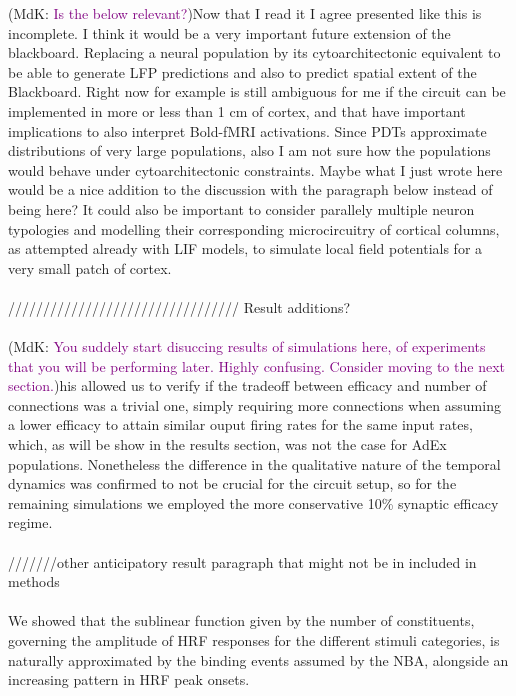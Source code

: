 \documentclass[10pt]{article}
\newcommand{\noteMdK}[2]{(MdK: \textcolor{purple}{#1})}
\newcommand{\notenewMP}[3]{(MP: \textcolor{blue}{#1})}
\begin{document}
\noteMdK{Is the below relevant?} 
\notenewMP{Now that I read it I agree presented like this is incomplete. I think it would be a very important future extension of the blackboard. Replacing a neural population by its cytoarchitectonic equivalent to be able to generate LFP predictions and also to predict spatial extent of the Blackboard. Right now for example is still ambiguous for me if the circuit can be implemented in more or less than 1 cm of cortex, and that have important implications to also interpret Bold-fMRI activations. Since PDTs approximate distributions of very large populations, also I am not sure how the populations would behave under cytoarchitectonic constraints. Maybe what I just wrote here would be a nice addition to the discussion with the paragraph below instead of being here?} 
It could also be important to consider parallely multiple neuron typologies and modelling their corresponding microcircuitry of cortical columns, as attempted already with LIF models, to simulate local field potentials for a very small patch of cortex\cite{Mazzoni_2015,Hagen_2015}.\\~\\


\newpage
///////////////////////////////// Result additions?\\~\\

\noteMdK{You suddely start disuccing results of simulations here, of experiments that you will be performing later. Highly confusing. Consider moving to the next section.}

This allowed us to verify if the tradeoff between efficacy and number of connections was a trivial one, simply requiring more connections when assuming a lower efficacy to attain similar ouput firing rates for the same input rates, which, as will be show in the results section, was not the case for AdEx populations.
Nonetheless the difference in the qualitative nature of the temporal dynamics was confirmed to not be crucial for the circuit setup, so for the remaining simulations we employed the more conservative 10\% synaptic efficacy regime.\\~\\

///////other anticipatory result paragraph that might not be in included in methods\\~\\

We showed that the sublinear function given by the number of constituents, governing the amplitude of HRF responses for the different stimuli categories, is naturally approximated by the binding events assumed by the NBA, alongside an increasing pattern in HRF peak onsets.




\end{document}
